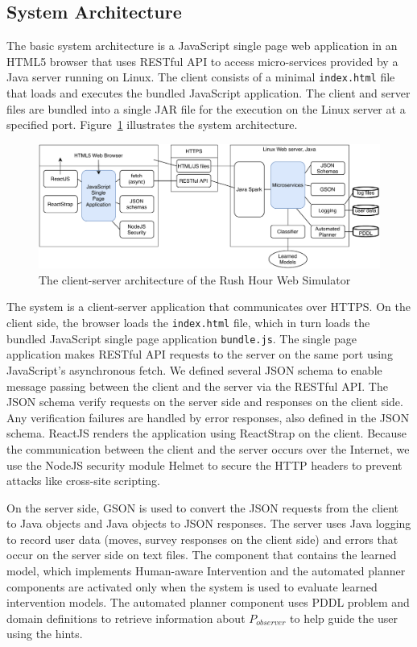 \subsection{System Architecture}
The basic system architecture is a JavaScript single page web application in an HTML5 browser that uses RESTful API to access micro-services provided by a Java server running on Linux. 
The client consists of a minimal \texttt{index.html} file that loads and executes the bundled JavaScript application. 
The client and server files are bundled into a single JAR file for the execution on the Linux server at a specified port. 
Figure~\ref{fig:architecture} illustrates the system architecture.

\begin{figure}[tpb]
  \centering
\includegraphics[width=\columnwidth]{img/architecture.pdf}
  \caption{The client-server architecture of the Rush Hour Web Simulator}
  \label{fig:architecture}
\end{figure}

The system is a client-server application that communicates over HTTPS. 
On the client side, the browser loads the \texttt{index.html} file, which in turn loads the bundled JavaScript single page application \texttt{bundle.js}. 
The single page application makes RESTful API requests to the server on the same port using JavaScript's asynchronous fetch. 
We defined several JSON schema to enable message passing between the client and the server via the RESTful API. 
The JSON schema verify requests on the server side and responses on the client side. 
Any verification failures are handled by error responses, also defined in the JSON schema. 
ReactJS renders the application using ReactStrap on the client. 
Because the communication between the client and the server occurs over the Internet, we use the NodeJS security module Helmet to secure the HTTP headers to prevent attacks like cross-site scripting.

On the server side, GSON is used to convert the JSON requests from the client to Java objects and Java objects to JSON responses. 
The server uses Java logging to record user data (moves, survey responses on the client side) and errors that occur on the server side on text files. 
The component that contains the learned model, which implements Human-aware Intervention and the automated planner components are activated only when the system is used to evaluate learned intervention models. 
The automated planner component uses PDDL problem and domain definitions to retrieve information about $P_{observer}$ to help guide the user using the hints.

